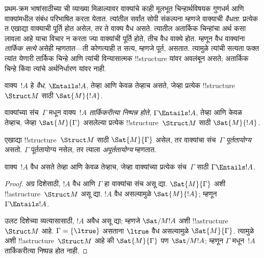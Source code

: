 \documentclass[../../../include/open-logic-section]{subfiles}
\begin{document}

\begin{explain}
प्रथम-क्रम भाषांसाठीच्या ची व्याख्या मिळाल्यावर वाक्यांचे
काही मूलभूत चिन्हार्थविषयक गुणधर्म आणि वाक्यांमधील संबंध परिभाषित करता
येतात. त्यांतील सर्वांत सोपी संकल्पना म्हणजे वाक्याची \emph{वैधता}.
प्रत्येक त एखाद्या वाक्याची पूर्ति होत असेल, तर ते
वाक्य वैध असते. त्यातील अतार्किक चिन्हांचा अर्थ कसा लावला आहे याचा
विचार न करता ज्या वाक्यांची पूर्ति होते, तीच वैध वाक्ये होत. म्हणून वैध
वाक्यांना \emph{तार्किक सत्ये} असेही म्हणतात---ती कोणत्याही
त सत्य, म्हणजे पूर्त, असतात. त्यामुळे त्यांची सत्यता
फक्त त्यांत येणारी तार्किक चिन्हे आणि त्यांची विन्यासात्मक !!{structure}
यांवर अवलंबून असते; अतार्किक चिन्हे किंवा त्यांचे अर्थनिर्धारण यांवर नाही.
\end{explain}

\begin{defn}[वैधता]
वाक्य~$!A$ हे \emph{वैध}, $\Entails !A$, तेव्हा आणि केवळ तेव्हाच असते,
जेव्हा प्रत्येक !!{structure}~$\Struct M$ साठी $\Sat{M}{!A}$.
\end{defn}

\begin{defn}[तार्किक निष्पन्नता]
वाक्यांच्या संच~$\Gamma$ मधून वाक्य~$!A$
\emph{तार्किकरीत्या निष्पन्न होते}, $\Gamma \Entails !A$, तेव्हा आणि
केवळ तेव्हाच, जेव्हा $\Sat{M}{\Gamma}$ असलेल्या प्रत्येक
!!{structure}~$\Struct M$ साठी $\Sat{M}{!A}$.
\end{defn}


\begin{defn}[पूर्ततायोग्यता]
एखाद्या !!{structure}~$\Struct M$ साठी $\Sat{M}{\Gamma}$ असेल, तर
वाक्यांचा संच~$\Gamma$ \emph{पूर्ततायोग्य} असतो. $\Gamma$
पूर्ततायोग्य नसेल, तर त्याला \emph{अपूर्ततायोग्य} म्हणतात.
\end{defn}

\begin{prop}
वाक्य~$!A$ वैध असते तेव्हा आणि केवळ तेव्हाच, जेव्हा
वाक्यांच्या प्रत्येक संच~$\Gamma$ साठी $\Gamma \Entails !A$.
\end{prop}

\begin{proof}
अग्र दिशेसाठी, $!A$ वैध आणि $\Gamma$ हा वाक्यांचा संच असू द्या.
$\Sat{M}{\Gamma}$ अशी !!a{structure}~$\Struct M$ असू द्या. $!A$ वैध
असल्यामुळे $\Sat{M}{!A}$; म्हणून $\Gamma \Entails !A$.

उलट दिशेच्या व्यत्यासासाठी, $!A$ अवैध असू द्या; म्हणजे
$\Sat/{M}{!A}$ अशी !!a{structure}~$\Struct M$ आहे. $\Gamma =
\{ \ltrue \}$ असताना $\ltrue$ वैध असल्यामुळे $\Sat{M}{\Gamma}$.
त्यामुळे अशी !!a{structure}~$\Struct M$ आहे की $\Sat{M}{\Gamma}$ पण
$\Sat/{M}{!A}$; म्हणून $\Gamma$ मधून~$!A$ तार्किकरीत्या निष्पन्न होत
नाही.
\end{proof}
\end{document}
